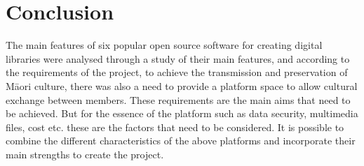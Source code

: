 \section{Conclusion}
The main features of six popular open source software for creating digital libraries were analysed through a study of their main features, and according to the requirements of the project, to achieve the transmission and preservation of Māori culture, there was also a need to provide a platform space to allow cultural exchange between members. These requirements are the main aims that need to be achieved. But for the essence of the platform such as data security, multimedia files, cost etc. these are the factors that need to be considered. It is possible to combine the different characteristics of the above platforms and incorporate their main strengths to create the project.

